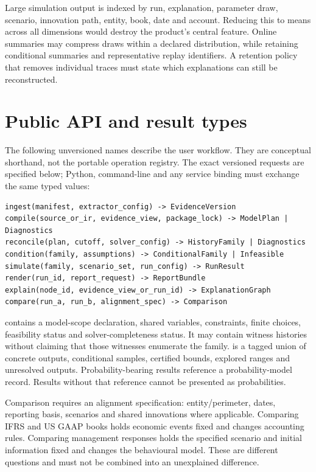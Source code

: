 Large simulation output is indexed by run, explanation, parameter draw,
scenario, innovation path, entity, book, date and account. Reducing this to
means across all dimensions would destroy the product's central feature.
Online summaries may compress draws within a declared distribution, while
retaining conditional summaries and representative replay identifiers. A
retention policy that removes individual traces must state which explanations
can still be reconstructed.

\begin{minipage}{\linewidth}
\section{Public API and result types}

The following unversioned names describe the user workflow. They are conceptual
shorthand, not the portable operation registry. The exact versioned requests
are specified below; Python, command-line and any service binding must exchange
the same typed values:
\begin{lstlisting}
ingest(manifest, extractor_config) -> EvidenceVersion
compile(source_or_ir, evidence_view, package_lock) -> ModelPlan | Diagnostics
reconcile(plan, cutoff, solver_config) -> HistoryFamily | Diagnostics
condition(family, assumptions) -> ConditionalFamily | Infeasible
simulate(family, scenario_set, run_config) -> RunResult
render(run_id, report_request) -> ReportBundle
explain(node_id, evidence_view_or_run_id) -> ExplanationGraph
compare(run_a, run_b, alignment_spec) -> Comparison
\end{lstlisting}
\end{minipage}

 contains a model-scope declaration, shared variables,
constraints, finite choices, feasibility status and solver-completeness status.
It may contain witness histories without claiming that those witnesses
enumerate the family.  is a tagged union of concrete outputs,
conditional samples, certified bounds, explored ranges and unresolved outputs.
Probability-bearing results reference a probability-model record. Results
without that reference cannot be presented as probabilities.

Comparison requires an alignment specification: entity/perimeter, dates,
reporting basis, scenarios and shared innovations where applicable. Comparing
IFRS and US GAAP books holds economic events fixed and changes accounting
rules. Comparing management responses holds the specified scenario and
initial information fixed and changes the behavioural model. These are
different questions and must not be combined into an unexplained difference.


